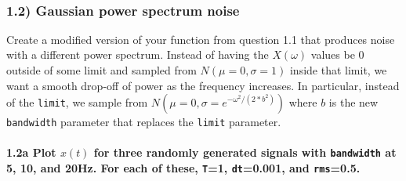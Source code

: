 \documentclass{article}
\begin{document}
    \begin{center}
    \end{center}
    { \hspace*{\fill} \\}
    
    \subsubsection{1.2) Gaussian power spectrum
noise}\label{gaussian-power-spectrum-noise}

Create a modified version of your function from question 1.1 that
produces noise with a different power spectrum. Instead of having the
$X(\omega)$ values be 0 outside of some limit and sampled from
$N(\mu=0,\sigma=1)$ inside that limit, we want a smooth drop-off of
power as the frequency increases. In particular, instead of the
\texttt{limit}, we sample from $N(\mu=0,\sigma=e^{-{\omega^2/(2*b^2)}})$
where $b$ is the new \texttt{bandwidth} parameter that replaces the
\texttt{limit} parameter.

    \paragraph{1.2a Plot $x(t)$ for three randomly generated signals with
\texttt{bandwidth} at 5, 10, and 20Hz. For each of these, \texttt{T}=1,
\texttt{dt}=0.001, and
\texttt{rms}=0.5.}\label{a-plot-xt-for-three-randomly-generated-signals-with-bandwidth-at-5-10-and-20hz.-for-each-of-these-t1-dt0.001-and-rms0.5.}
\end{document}
